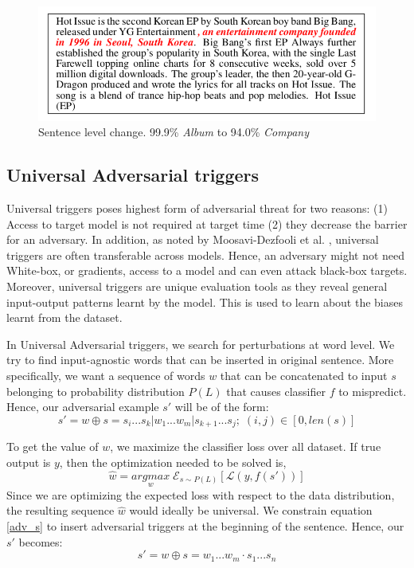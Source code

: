 \documentclass[12pt]{report}
\begin{document}
\begin{spacing}{1.5}
\begin{figure}[!h]
  \centering
  \includegraphics[width=0.8\linewidth]{./img/liang_sen.png}
  \caption{Sentence level change. 99.9\% \textit{Album} to 94.0\% \textit{Company} \cite{liang2018}}
  \label{liang_sen}
\end{figure}

\subsection{Universal Adversarial triggers}
\label{adv_theory}
Universal triggers poses highest form of adversarial threat for two reasons: (1) Access to target model is not required at target time (2) they decrease the barrier for an adversary. In addition, as noted by Moosavi-Dezfooli et al. \cite{moosavi-dezfooli}, universal triggers are often transferable across models. Hence, an adversary might not need White-box, or gradients, access to a model and can even attack black-box targets.
Moreover, universal triggers are unique evaluation tools as they reveal general input-output patterns learnt by the model. This is used to learn about the biases learnt from the dataset.
\par
In Universal Adversarial triggers, we search for perturbations at word level.
We try to find input-agnostic words that can be inserted in original sentence.
More specifically, we want a sequence of words $w$ that can be concatenated to input $s$ belonging to probability distribution $P(L)$ that causes classifier $f$ to mispredict.
Hence, our adversarial example $s'$ will be of the form:
\begin{equation}
  \label{adv_s}
  s' = w \oplus s = s_i...s_k | w_1...w_m | s_{k+1}...s_j; \; (i,j) \in [0, len(s)] 
\end{equation}

To get the value of $w$, we maximize the classifier loss over all dataset. If true output is $y$, then the optimization needed to be solved is,
\begin{equation}
  \label{eq: optim}
  \hat{w} = \underset{w}{argmax} \; \mathcal{E}_{s \sim P(L)}[\mathcal{L}(y, f(s'))]
\end{equation}
Since we are optimizing the expected loss with respect to the
data distribution, the resulting sequence $\hat{w}$ would ideally be
universal. We constrain equation \ref{adv_s} to insert adversarial triggers at the beginning of the sentence. Hence, our $s'$ becomes:
\begin{equation}
  \label{eq: trigger}
  s' = w \oplus s = w_1...w_m \cdot s_1...s_n
\end{equation}


\end{spacing}
\end{document}
